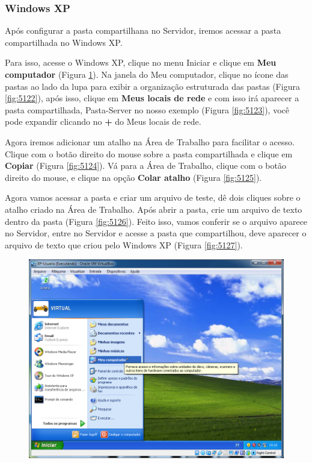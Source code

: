 \documentclass[10pt]{article}
\begin{document}
\subsubsection{Windows XP}
\par Após configurar a pasta compartilhana no Servidor, iremos acessar a pasta compartilhada no Windows XP.
\par Para isso, acesse o Windows XP, clique no menu Iniciar e clique em \textbf{Meu computador} (Figura \ref{fig:5121}). Na janela do Meu computador, clique no ícone das pastas ao lado da lupa para exibir a organização estruturada das pastas (Figura \ref{fig:5122}), após isso, clique em \textbf{Meus locais de rede} e com isso irá aparecer a pasta compartilhada, Pasta-Server no nosso exemplo (Figura \ref{fig:5123}), você pode expandir clicando no \textbf{+} do Meus locais de rede.
\par Agora iremos adicionar um atalho na Área de Trabalho para facilitar o acesso. Clique com o botão direito do mouse sobre a pasta compartilhada e clique em \textbf{Copiar} (Figura \ref{fig:5124}). Vá para a Área de Trabalho, clique com o botão direito do mouse, e clique na opção \textbf{Colar atalho} (Figura \ref{fig:5125}).
\par Agora vamos acessar a pasta e criar um arquivo de teste, dê dois cliques sobre o atalho criado na Área de Trabalho. Após abrir a pasta, crie um arquivo de texto dentro da pasta (Figura \ref{fig:5126}). Feito isso, vamos conferir se o arquivo aparece no Servidor, entre no Servidor e acesse a pasta que compartilhou, deve aparecer o arquivo de texto que criou pelo Windows XP (Figura \ref{fig:5127}).
\begin{figure}[H]
    \centering
    \caption{}
    \label{fig:5121}
    \includegraphics[width=\linewidth]{images/windows_server/compartilhamento/018.png}
\end{figure}
\end{document}
